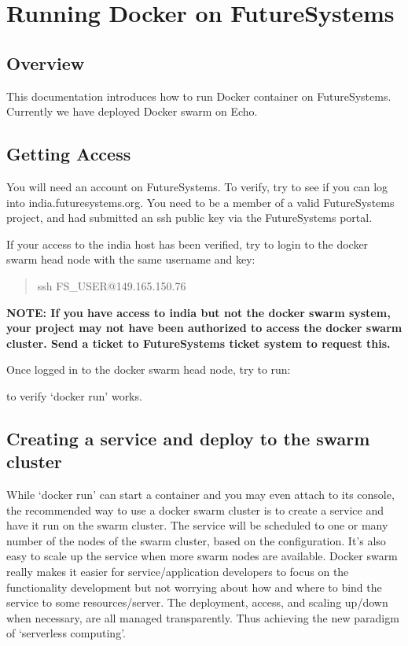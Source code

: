 \chapter{Running Docker on FutureSystems}\label{S:docker-fg}

\FILENAME

\section{Overview}\label{overview}

This documentation introduces how to run Docker container on
FutureSystems. Currently we have deployed Docker swarm on Echo.

\section{Getting Access}\label{getting-access}

You will need an account on FutureSystems. To verify, try to see if you
can log into india.futuresystems.org. You need to be a member of a valid
FutureSystems project, and had submitted an ssh public key via the
FutureSystems portal.

If your access to the india host has been verified, try to login to the
docker swarm head node with the same username and key:

\begin{quote}
ssh FS_USER@149.165.150.76
\end{quote}

\textbf{NOTE: If you have access to india but not the docker swarm
system, your project may not have been authorized to access the docker
swarm cluster. Send a ticket to FutureSystems ticket system to request
this.}

Once logged in to the docker swarm head node, try to run:

to verify `docker run' works.

\section{Creating a service and deploy to the swarm
cluster}\label{creating-a-service-and-deploy-to-the-swarm-cluster}

While `docker run' can start a container and you may even attach to its
console, the recommended way to use a docker swarm cluster is to create
a service and have it run on the swarm cluster. The service will be
scheduled to one or many number of the nodes of the swarm cluster, based
on the configuration. It's also easy to scale up the service when more
swarm nodes are available. Docker swarm really makes it easier for
service/application developers to focus on the functionality development
but not worrying about how and where to bind the service to some
resources/server. The deployment, access, and scaling up/down when
necessary, are all managed transparently. Thus achieving the new
paradigm of `serverless computing'.

